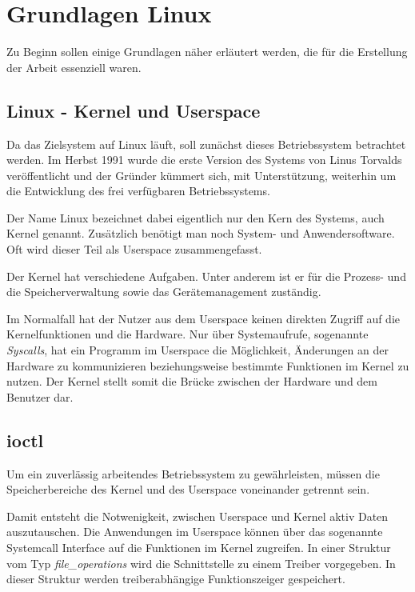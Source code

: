 \chapter{Grundlagen Linux} \label{sec:grund}
Zu Beginn sollen einige Grundlagen näher erläutert werden, die für die Erstellung der Arbeit essenziell waren.

\section{Linux - Kernel und Userspace}\label{sec:linux}
Da das Zielsystem auf Linux läuft, soll zunächst dieses Betriebssystem betrachtet werden. 
Im Herbst 1991 wurde die erste Version des Systems von Linus Torvalds veröffentlicht und der Gründer kümmert sich, mit Unterstützung, weiterhin um die Entwicklung des frei verfügbaren Betriebssystems. \citep[S. 53f.]{plotner2012linux}
 
Der Name Linux bezeichnet dabei eigentlich nur den Kern des Systems, auch Kernel genannt. Zusätzlich benötigt man noch System- und Anwendersoftware. Oft wird dieser Teil als Userspace zusammengefasst. \citep[S. 46]{plotner2012linux} 

Der Kernel hat verschiedene Aufgaben. Unter anderem ist er für die Prozess- und die Speicherverwaltung sowie das Gerätemanagement zuständig. \citep[S. 234]{schroder2009embedded} 

Im Normalfall hat der Nutzer aus dem Userspace keinen direkten Zugriff auf die Kernelfunktionen und die Hardware. Nur über Systemaufrufe, sogenannte \textit{Syscalls}, hat ein Programm im Userspace die Möglichkeit, Änderungen an der Hardware zu kommunizieren beziehungsweise bestimmte Funktionen im Kernel zu nutzen. \citep[S. 124]{plotner2012linux} 
Der Kernel stellt somit die Brücke zwischen der Hardware und dem Benutzer dar.


\section{\acl{ioctl}}\label{sec:ioctl_t}
Um ein zuverlässig arbeitendes Betriebssystem zu gewährleisten, müssen die Speicherbereiche des Kernel und des Userspace voneinander getrennt sein. \citep[S. 233]{schroder2009embedded} %

Damit entsteht die Notwenigkeit, zwischen Userspace und Kernel aktiv Daten auszutauschen. Die Anwendungen im Userspace können über das sogenannte Systemcall Interface auf die Funktionen im Kernel zugreifen. In einer Struktur vom Typ \textit{file\_operations} wird die Schnittstelle zu einem Treiber vorgegeben. In dieser Struktur werden treiberabhängige Funktionszeiger gespeichert. \citep[S. 249]{schroder2009embedded} %

